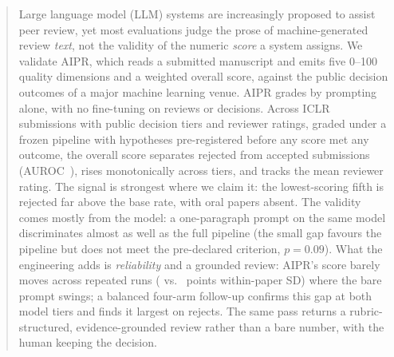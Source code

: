\begin{abstract}
\noindent
Large language model (LLM) systems are increasingly proposed to assist peer review,
yet most evaluations judge the prose of machine-generated review \emph{text}, not the
validity of the numeric \emph{score} a system assigns. We validate \textsc{AIPR},
which reads a submitted manuscript and emits five 0--100 quality dimensions and a
weighted overall score, against the public decision outcomes of a major machine
learning venue. AIPR grades by prompting alone, with no fine-tuning on reviews or
decisions. Across \NminiPrimary{} ICLR submissions with public decision tiers and
reviewer ratings, graded under a frozen pipeline with hypotheses pre-registered before
any score met any outcome, the overall score separates rejected from accepted
submissions (AUROC~\aurocMiniFull), rises monotonically across tiers, and tracks the
mean reviewer rating. The signal is strongest where we claim it: the lowest-scoring
fifth is rejected far above the base rate, with oral papers absent. The validity comes mostly from the model: a one-paragraph prompt on
the same model discriminates almost as well as the full pipeline (the small gap favours
the pipeline but does not meet the pre-declared criterion, $p=0.09$). What the engineering adds is
\emph{reliability} and a grounded review: AIPR's score barely moves across repeated runs
(\fullRunSD{} vs.\ \naiveRunSD{} points within-paper SD) where the bare prompt swings; a
balanced four-arm follow-up confirms this gap at both model tiers and finds it largest on
rejects. The same pass returns a rubric-structured, evidence-grounded review rather than a
bare number, with the human keeping the decision.
\end{abstract}
